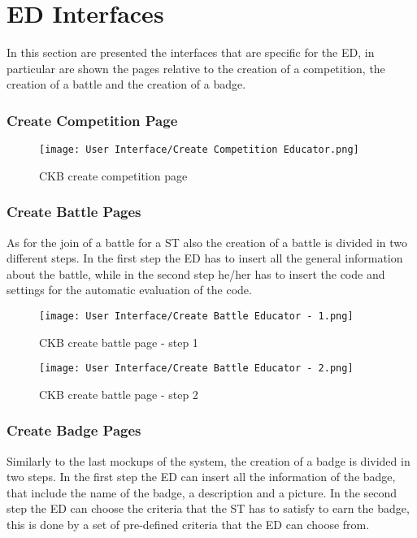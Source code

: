 \newpage

\section*{ED Interfaces}
\label{s:ED_interface}%

In this section are presented the interfaces that are specific for the ED, in particular are shown the pages relative to the creation of a competition, the creation of a battle and the creation of a badge.

\subsubsection*{Create Competition Page}
\label{ss:create_competition_page}%

\begin{figure}[H]
  \centering
  \texttt{[image: User Interface/Create Competition Educator.png]}
  \caption{CKB create competition page}
  \label{fig:create_competition}
\end{figure}


\subsubsection*{Create Battle Pages}
\label{ss:create_battle_pages}%
As for the join of a battle for a ST also the creation of a battle is divided in two different steps. In the first step the ED has to insert all the general information about the battle, while in the second step he/her has to insert the code and settings for the automatic evaluation of the code.

\begin{figure}[H]
  \centering
  \texttt{[image: User Interface/Create Battle Educator - 1.png]}
  \caption{CKB create battle page - step 1}
  \label{fig:create_battle1}
\end{figure}

\begin{figure}[H]
  \centering
  \texttt{[image: User Interface/Create Battle Educator - 2.png]}
  \caption{CKB create battle page - step 2}
  \label{fig:create_battle2}
\end{figure}


\subsubsection*{Create Badge Pages}
\label{ss:create_badge_pages}%
Similarly to the last mockups of the system, the creation of a badge is divided in two steps. In the first step the ED can insert all the information of the badge, that include the name of the badge, a description and a picture. In the second step the ED can choose the criteria that the ST has to satisfy to earn the badge, this is done by a set of pre-defined criteria that the ED can choose from.

